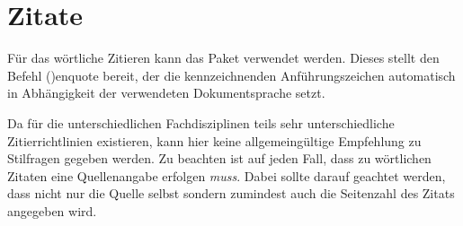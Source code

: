 \documentclass[%
  english,ngerman,%
  cdgeometry=no,DIV=12,%
  cd=false,cdfont=false,cdtitle=true,%
  headings=normal,%
  automark,%
  listof=toc,%
]{tudscrartcl}
\begin{document}
\section{Zitate}

Für das wörtliche Zitieren kann das Paket  verwendet werden. 
Dieses stellt den Befehl \Macro(){enquote} bereit, der die 
kennzeichnenden Anführungszeichen automatisch in Abhängigkeit der verwendeten 
Dokumentsprache setzt. 
%
\begin{Hint}
\usepackage{csquotes}
\end{Hint}
%
Da für die unterschiedlichen Fachdisziplinen teils sehr unterschiedliche 
Zitierrichtlinien existieren, kann hier keine allgemeingültige Empfehlung zu 
Stilfragen gegeben werden. Zu beachten ist auf jeden Fall, dass zu wörtlichen 
Zitaten eine Quellenangabe erfolgen \emph{muss}. Dabei sollte darauf geachtet 
werden, dass nicht nur die Quelle selbst sondern zumindest auch die Seitenzahl 
des Zitats angegeben wird.
%
\end{document}
